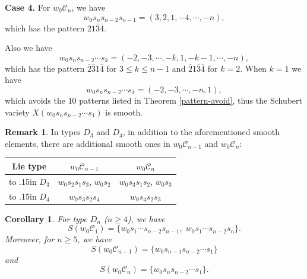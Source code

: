 \documentclass[11pt, reqno]{amsart}
\def\mystrut{\vbox to .15in{}}
\newtheorem{cor}[Thm]{Corollary}
\theoremstyle{definition}
\newtheorem{Rem}[Thm]{Remark}
\numberwithin{equation}{section}
\begin{document}
{\bf Case 4.} For $ w_0\mathcal{C}_{n}$, we have
   $$ w_0s_ns_{n-2}s_{n-1}=(3,2,1,-4,\cdots,-n),$$
which has the pattern $21\bar{3}\bar{4}$.

Also we have $$w_0s_{n}s_{n-2}\cdots s_k=(-2,-3,\cdots,-k,1,-k-1,\cdots,-n),$$
which has the pattern $\bar{2}\bar{3}1\bar{4}$ for $3\leq k\leq n-1$ and $\bar{2}1\bar{3}\bar{4}$ for $k=2$. When $k=1$ we have $$w_0s_{n}s_{n-2}\cdots s_1=(-2,-3,\cdots,-n,1),$$ which avoids the $10$ patterns listed in Theorem \ref{pattern-avoid}, thus the Schubert variety $X(w_0s_{n}s_{n-2}\cdots s_1)$ is smooth.
\begin{Rem}
   In types $D_3$ and $D_4$, in addition to the aforementioned smooth elements, there are additional smooth ones in $w_0\mathcal{C}_{n-1}$ and $w_0\mathcal{C}_{n}$:
    \smallskip
\begin{center}
\begin{tabular}{c|c|c}
\hline
 Lie type  &  $w_0\mathcal{C}_{n-1}$ &  $w_0\mathcal{C}_{n}$ \\
\hline
\mystrut
$D_3$  & $w_0s_{2}s_{1}s_3$, $w_0s_{2}$ & $w_0s_{3}s_{1}s_2$, $w_0s_{3}$ \\[.05in]
\hline
\mystrut
$D_4$ & $w_0s_{3}s_{2}s_4$ & $w_0s_4s_2s_3$
   \\[.05in]
\hline


\end{tabular}
\end{center}
\medskip
\end{Rem}

\begin{cor}\label{smooth}
    For type $D_n$ ($n\geq 4$), we have  
$$S(w_0\mathcal{C}_1)=\{w_0s_1\cdots s_{n-2}s_{n-1},\; w_0s_1\cdots s_{n-2}s_{n}\}.$$  
Moreover, for $n\geq 5$, we have $$S(w_0\mathcal{C}_{n-1})=\{w_0s_{n-1}s_{n-2}\cdots s_1\}$$ and $$S(w_0\mathcal{C}_n)=\{w_0s_{n}s_{n-2}\cdots s_1\}.$$
\end{cor}
\end{document}
